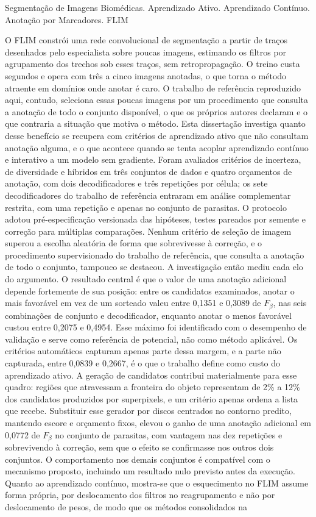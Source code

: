\documentclass[dissertmst]{ufscar}
\begin{document}
\begin{resumo}{Segmentação de Imagens Biomédicas. Aprendizado Ativo. Aprendizado Contínuo. Anotação por Marcadores. FLIM}

O \ac{FLIM} constrói uma rede convolucional de segmentação a partir de traços desenhados pelo especialista sobre poucas imagens, estimando os filtros por agrupamento dos trechos sob esses traços, sem retropropagação. O treino custa segundos e opera com três a cinco imagens anotadas, o que torna o método atraente em domínios onde anotar é caro. O trabalho de referência reproduzido aqui, contudo, seleciona essas poucas imagens por um procedimento que consulta a anotação de todo o conjunto disponível, o que os próprios autores declaram e o que contraria a situação que motiva o método. Esta dissertação investiga quanto desse benefício se recupera com critérios de aprendizado ativo que não consultam anotação alguma, e o que acontece quando se tenta acoplar aprendizado contínuo e interativo a um modelo sem gradiente. Foram avaliados critérios de incerteza, de diversidade e híbridos em três conjuntos de dados e quatro orçamentos de anotação, com dois decodificadores e três repetições por célula; os sete decodificadores do trabalho de referência entraram em análise complementar restrita, com uma repetição e apenas no conjunto de parasitas. O protocolo adotou pré-especificação versionada das hipóteses, testes pareados por semente e correção para múltiplas comparações. Nenhum critério de seleção de imagem superou a escolha aleatória de forma que sobrevivesse à correção, e o procedimento supervisionado do trabalho de referência, que consulta a anotação de todo o conjunto, tampouco se destacou. A investigação então mediu cada elo do argumento. O resultado central é que o valor de uma anotação adicional depende fortemente de sua posição: entre os candidatos examinados, anotar o mais favorável em vez de um sorteado valeu entre 0,1351 e 0,3089 de $F_\beta$, nas seis combinações de conjunto e decodificador, enquanto anotar o menos favorável custou entre 0,2075 e 0,4954. Esse máximo foi identificado com o desempenho de validação e serve como referência de potencial, não como método aplicável. Os critérios automáticos capturam apenas parte dessa margem, e a parte não capturada, entre 0,0839 e 0,2667, é o que o trabalho define como custo do aprendizado ativo. A geração de candidatos contribui materialmente para esse quadro: regiões que atravessam a fronteira do objeto representam de 2\% a 12\% dos candidatos produzidos por superpixels, e um critério apenas ordena a lista que recebe. Substituir esse gerador por discos centrados no contorno predito, mantendo escore e orçamento fixos, elevou o ganho de uma anotação adicional em 0,0772 de $F_\beta$ no conjunto de parasitas, com vantagem nas dez repetições e sobrevivendo à correção, sem que o efeito se confirmasse nos outros dois conjuntos. O comportamento nos demais conjuntos é compatível com o mecanismo proposto, incluindo um resultado nulo previsto antes da execução. Quanto ao aprendizado contínuo, mostra-se que o esquecimento no \ac{FLIM} assume forma própria, por deslocamento dos filtros no reagrupamento e não por deslocamento de pesos, de modo que os métodos consolidados na 
\end{resumo}
\end{document}
